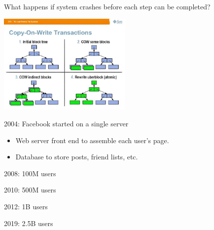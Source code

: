 \begin{slide}

    
    What happens if system crashes before each step can be completed?
    \bigskip

    \includegraphics[width=65mm]{zfs.jpg}

\end{slide}

\begin{slide}


    2004: Facebook started on a single server
    \begin{itemize}
        \item Web server front end to assemble each user’s page. 
        \item Database to store posts, friend lists, etc.
    \end{itemize}
    \medskip

    2008: 100M users
    \medskip

    2010: 500M users
    \medskip

    2012: 1B users
    \medskip

    2019: 2.5B users
    \medskip

\end{slide}

